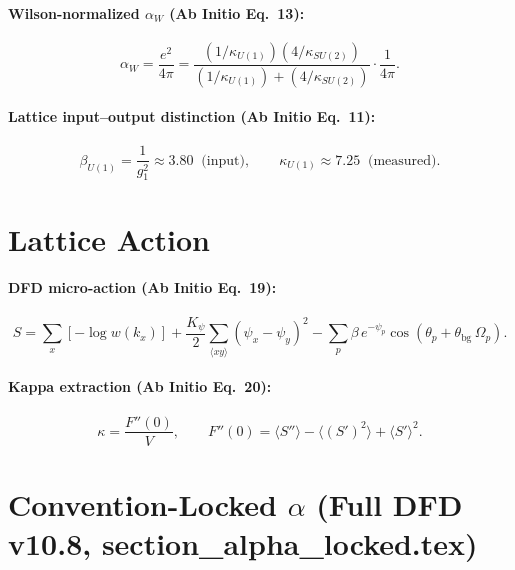 \documentclass[11pt]{article}
\begin{document}
\paragraph{Wilson-normalized $\alpha_W$ (Ab Initio Eq.~13):}
\begin{equation}\tag{GC-5}
\boxed{\alpha_W = \frac{e^2}{4\pi} = \frac{(1/\kappa_{U(1)})(4/\kappa_{SU(2)})}{(1/\kappa_{U(1)}) + (4/\kappa_{SU(2)})} \cdot \frac{1}{4\pi}.}
\end{equation}

\paragraph{Lattice input--output distinction (Ab Initio Eq.~11):}
\begin{equation}\tag{GC-6}
\beta_{U(1)} = \frac{1}{g_1^2} \approx 3.80 \;\;\text{(input)}, \qquad \kappa_{U(1)} \approx 7.25 \;\;\text{(measured)}.
\end{equation}

\section{Lattice Action}

\paragraph{DFD micro-action (Ab Initio Eq.~19):}
\begin{equation}\tag{LA-1}
S = \sum_x [-\log w(k_x)] + \frac{K_\psi}{2}\sum_{\langle xy\rangle}(\psi_x - \psi_y)^2 - \sum_p \beta\,e^{-\psi_p}\cos(\theta_p + \theta_{\mathrm{bg}}\,\Omega_p).
\end{equation}

\paragraph{Kappa extraction (Ab Initio Eq.~20):}
\begin{equation}\tag{LA-2}
\kappa = \frac{F''(0)}{V}, \qquad F''(0) = \langle S''\rangle - \langle (S')^2\rangle + \langle S'\rangle^2.
\end{equation}

\section{Convention-Locked $\alpha$ (Full DFD v10.8, section\_alpha\_locked.tex)}
\end{document}
